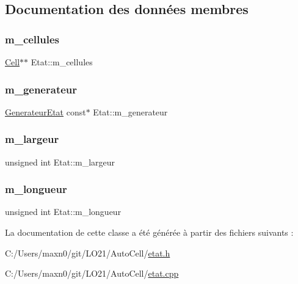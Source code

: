 \subsection{Documentation des données membres}
\mbox{\label{class_etat_ad174c3c55c15e9d8274f1c4b78af01bd}} 
\subsubsection{\texorpdfstring{m\+\_\+cellules}{m\_cellules}}
{\footnotesize\ttfamily \mbox{\hyperlink{class_cell}{Cell}}$\ast$$\ast$ Etat\+::m\+\_\+cellules\hspace{0.3cm}{\ttfamily [private]}}

\mbox{\label{class_etat_a15bd9b75fe2fe7a556afce7958f82e08}} 
\subsubsection{\texorpdfstring{m\+\_\+generateur}{m\_generateur}}
{\footnotesize\ttfamily \mbox{\hyperlink{class_generateur_etat}{Generateur\+Etat}} const$\ast$ Etat\+::m\+\_\+generateur\hspace{0.3cm}{\ttfamily [private]}}

\mbox{\label{class_etat_af575fb141b3c300c9cbb61337094ba1b}} 
\subsubsection{\texorpdfstring{m\+\_\+largeur}{m\_largeur}}
{\footnotesize\ttfamily unsigned int Etat\+::m\+\_\+largeur\hspace{0.3cm}{\ttfamily [private]}}

\mbox{\label{class_etat_af45c3a2898f8b1aed04c6f21705735b0}} 
\subsubsection{\texorpdfstring{m\+\_\+longueur}{m\_longueur}}
{\footnotesize\ttfamily unsigned int Etat\+::m\+\_\+longueur\hspace{0.3cm}{\ttfamily [private]}}



La documentation de cette classe a été générée à partir des fichiers suivants \+:\begin{DoxyCompactItemize}
\item 
C\+:/\+Users/maxn0/git/\+L\+O21/\+Auto\+Cell/\mbox{\hyperlink{etat_8h}{etat.\+h}}\item 
C\+:/\+Users/maxn0/git/\+L\+O21/\+Auto\+Cell/\mbox{\hyperlink{etat_8cpp}{etat.\+cpp}}\end{DoxyCompactItemize}
